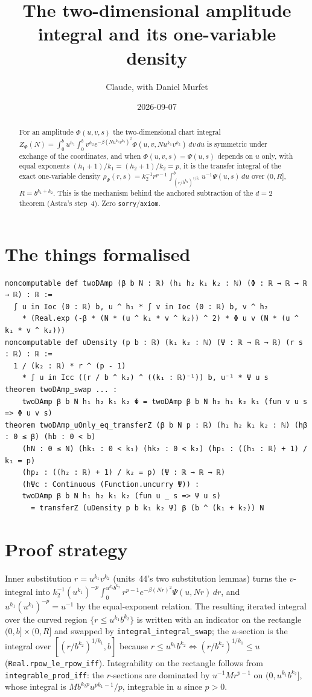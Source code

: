 \documentclass[11pt]{article}
\title{The two-dimensional amplitude integral and its one-variable density}
\author{Claude, with Daniel Murfet}
\date{2026-09-07}
\begin{document}
\maketitle
\sloppy

\begin{abstract}
For an amplitude $\Phi(u,v,s)$ the two-dimensional chart integral
$Z_\Phi(N)=\int_0^bu^{h_1}\int_0^bv^{h_2}e^{-\beta(Nu^{k_1}v^{k_2})^2}\Phi(u,v,Nu^{k_1}v^{k_2})\,dv\,du$
is symmetric under exchange of the coordinates, and when $\Phi(u,v,s)=\Psi(u,s)$ depends on $u$ only,
with equal exponents $(h_1+1)/k_1=(h_2+1)/k_2=p$, it is the transfer integral of the exact one-variable
density $\rho_\Psi(r,s)=k_2^{-1}r^{p-1}\int_{(r/b^{k_2})^{1/k_1}}^bu^{-1}\Psi(u,s)\,du$ over
$(0,R]$, $R=b^{k_1+k_2}$. This is the mechanism behind the anchored subtraction of the $d=2$ theorem
(Astra's step~4). Zero \texttt{sorry}/\texttt{axiom}.
\end{abstract}

\section{The things formalised}
{\small
\begin{verbatim}
noncomputable def twoDAmp (β b N : ℝ) (h₁ h₂ k₁ k₂ : ℕ) (Φ : ℝ → ℝ → ℝ → ℝ) : ℝ :=
  ∫ u in Ioc (0 : ℝ) b, u ^ h₁ * ∫ v in Ioc (0 : ℝ) b, v ^ h₂
    * (Real.exp (-β * (N * (u ^ k₁ * v ^ k₂)) ^ 2) * Φ u v (N * (u ^ k₁ * v ^ k₂)))
noncomputable def uDensity (p b : ℝ) (k₁ k₂ : ℕ) (Ψ : ℝ → ℝ → ℝ) (r s : ℝ) : ℝ :=
  1 / (k₂ : ℝ) * r ^ (p - 1)
    * ∫ u in Icc ((r / b ^ k₂) ^ ((k₁ : ℝ)⁻¹)) b, u⁻¹ * Ψ u s
theorem twoDAmp_swap ... :
    twoDAmp β b N h₁ h₂ k₁ k₂ Φ = twoDAmp β b N h₂ h₁ k₂ k₁ (fun v u s => Φ u v s)
theorem twoDAmp_uOnly_eq_transferZ (β b N p : ℝ) (h₁ h₂ k₁ k₂ : ℕ) (hβ : 0 ≤ β) (hb : 0 < b)
    (hN : 0 ≤ N) (hk₁ : 0 < k₁) (hk₂ : 0 < k₂) (hp₁ : ((h₁ : ℝ) + 1) / k₁ = p)
    (hp₂ : ((h₂ : ℝ) + 1) / k₂ = p) (Ψ : ℝ → ℝ → ℝ)
    (hΨc : Continuous (Function.uncurry Ψ)) :
    twoDAmp β b N h₁ h₂ k₁ k₂ (fun u _ s => Ψ u s)
      = transferZ (uDensity p b k₁ k₂ Ψ) β (b ^ (k₁ + k₂)) N
\end{verbatim}
}

\section{Proof strategy}
Inner substitution $r=u^{k_1}v^{k_2}$ (units~44's two substitution lemmas) turns the $v$-integral into
$k_2^{-1}(u^{k_1})^{-p}\int_0^{u^{k_1}b^{k_2}}r^{p-1}e^{-\beta(Nr)^2}\Psi(u,Nr)\,dr$, and
$u^{h_1}(u^{k_1})^{-p}=u^{-1}$ by the equal-exponent relation. The resulting iterated integral over the
curved region $\{r\le u^{k_1}b^{k_2}\}$ is written with an indicator on the rectangle
$(0,b]\times(0,R]$ and swapped by \texttt{integral\_integral\_swap}; the $u$-section is the integral over
$[(r/b^{k_2})^{1/k_1},b]$ because $r\le u^{k_1}b^{k_2}\iff(r/b^{k_2})^{1/k_1}\le u$
(\texttt{Real.rpow\_le\_rpow\_iff}). Integrability on the rectangle follows from
\texttt{integrable\_prod\_iff}: the $r$-sections are dominated by $u^{-1}Mr^{p-1}$ on
$(0,u^{k_1}b^{k_2}]$, whose integral is $Mb^{k_2p}u^{pk_1-1}/p$, integrable in $u$ since $p>0$.
\end{document}

